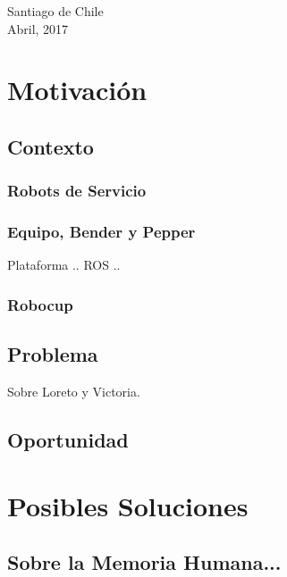 \documentclass[12pt,letterpaper,spanish]{article}
\begin{document}
\begin{titlepage}
{\large Santiago de Chile}\\[0cm]
{\large Abril, 2017}\\[1cm]

\vfill
 
\end{titlepage}

\section{Motivaci\'on}

\subsection{Contexto}

\subsubsection{Robots de Servicio}

\subsubsection{Equipo, Bender y Pepper}

Plataforma .. ROS ..

\subsubsection{Robocup}

\subsection{Problema}

Sobre Loreto  \cite{Sanchez:2015} y Victoria.

\subsection{Oportunidad}

\newpage
\section{Posibles Soluciones}

\subsection{Sobre la Memoria Humana...}
\end{document}
